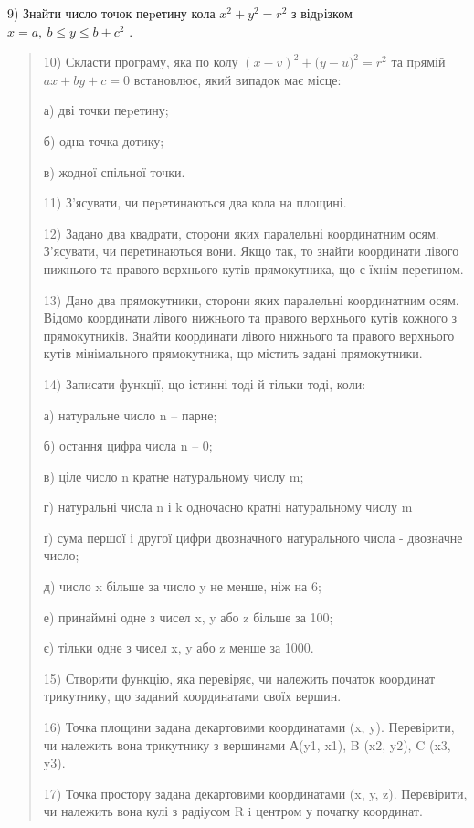 \documentclass[]{article}
\begin{document}
9) Знайти число точок пеpетину кола \(x^{2} + y^{2} = r^{2}\) з
відpізком \(x = a,\ b \leq y \leq b + c^{2}\) .

\begin{quote}
10) Скласти програму, яка по колу
\({(x - v)}^{2} + ({y - u)}^{2} = r^{2}\) та пpямій \(ax + by + c = 0\)
встановлює, який випадок має місце:

а) дві точки пеpетину;

б) одна точка дотику;

в) жодної спільної точки.

11) З'ясувати, чи пеpетинаються два кола на площині.

12) Задано два квадрати, сторони яких паралельні координатним осям.
З'ясувати, чи перетинаються вони. Якщо так, то знайти координати лівого
нижнього та правого верхнього кутів прямокутника, що є їхнім перетином.

13) Дано два прямокутники, сторони яких паралельні координатним осям.
Відомо координати лівого нижнього та правого верхнього кутів кожного з
прямокутників. Знайти координати лівого нижнього та правого верхнього
кутів мінімального прямокутника, що містить задані прямокутники.

14) Записати функції, що істинні тоді й тільки тоді, коли:

а) натуральне число n -- парне;

б) остання цифра числа n -- 0;

в) ціле число n кратне натуральному числу m;

г) натуральні числа n і k одночасно кратні натуральному числу m

ґ) сума першої і другої цифри двозначного натурального числа - двозначне
число;

д) число x більше за число y не менше, ніж на 6;

е) принаймні одне з чисел x, y або z більше за 100;

є) тільки одне з чисел x, y або z менше за 1000.

15) Створити функцію, яка перевіряє, чи належить початок координат
трикутнику, що заданий координатами своїх вершин.

16) Точка площини задана декартовими координатами (x, y). Перевірити, чи
належить вона трикутнику з вершинами А(y1, x1), B (x2, y2), C (x3, y3).

17) Точка простору задана декартовими координатами (x, y, z).
Перевірити, чи належить вона кулі з радіусом R i центром у початку
координат.


\end{quote}
\end{document}
